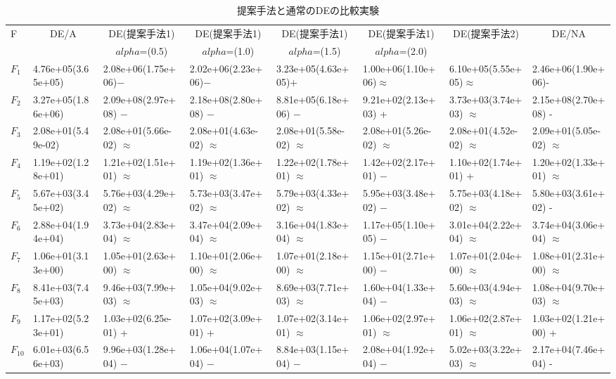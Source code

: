 \documentclass[a4paper,11pt,oneside,openany]{jsbook}
\begin{document}
\begin{landscape}
\begin{table}[!tbp]
\footnotesize
\caption{提案手法と通常のDEの比較実験\label{ref-tb-values}} 
\begin{center}
\begin{tabular}{llllllll}
\hline\hline
\multicolumn{1}{l}{F}&\multicolumn{1}{c}{DE/A}&\multicolumn{1}{c}{DE(提案手法1)}&\multicolumn{1}{c}{DE(提案手法1)}&\multicolumn{1}{c}{DE(提案手法1)}&\multicolumn{1}{c}{DE(提案手法1)}&\multicolumn{1}{c}{DE(提案手法2)}&\multicolumn{1}{c}{DE/NA}\tabularnewline
&&\multicolumn{1}{c}{{\scriptsize $alpha$=(0.5)}}&\multicolumn{1}{c}{{\scriptsize $alpha$=(1.0)}}&\multicolumn{1}{c}{{\scriptsize $alpha$=(1.5)}}&\multicolumn{1}{c}{{\scriptsize $alpha$=(2.0)}}&&\tabularnewline
\hline
$F_{1}$&4.76e+05(3.65e+05)&2.08e+06(1.75e+06)−&2.02e+06(2.23e+06)−&3.23e+05(4.63e+05)+&1.00e+06(1.10e+06)$\approx$&6.10e+05(5.55e+05)$\approx$&2.46e+06(1.90e+06)-\tabularnewline
$F_{2}$&3.27e+05(1.86e+06)&2.09e+08(2.97e+08) −&2.18e+08(2.80e+08) −&8.81e+05(6.18e+06) −&9.21e+02(2.13e+03) +&3.73e+03(3.74e+03) $\approx$&2.15e+08(2.70e+08) -\tabularnewline
$F_{3}$&2.08e+01(5.49e-02)&2.08e+01(5.66e-02) $\approx$&2.08e+01(4.63e-02) $\approx$&2.08e+01(5.58e-02) $\approx$&2.08e+01(5.26e-02) $\approx$&2.08e+01(4.52e-02) $\approx$&2.09e+01(5.05e-02) $\approx$\tabularnewline
$F_{4}$&1.19e+02(1.28e+01)&1.21e+02(1.51e+01) $\approx$&1.19e+02(1.36e+01) $\approx$&1.22e+02(1.78e+01) $\approx$&1.42e+02(2.17e+01) −&1.10e+02(1.74e+01) +&1.20e+02(1.33e+01) $\approx$\tabularnewline
$F_{5}$&5.67e+03(3.45e+02)&5.76e+03(4.29e+02) $\approx$&5.73e+03(3.47e+02) $\approx$&5.79e+03(4.33e+02) $\approx$&5.95e+03(3.48e+02) −&5.75e+03(4.18e+02) $\approx$&5.80e+03(3.61e+02) -\tabularnewline
$F_{6}$&2.88e+04(1.94e+04)&3.73e+04(2.83e+04) $\approx$&3.47e+04(2.09e+04) $\approx$&3.16e+04(1.83e+04) $\approx$&1.17e+05(1.10e+05) −&3.01e+04(2.22e+04) $\approx$&3.74e+04(3.06e+04) $\approx$\tabularnewline
$F_{7}$&1.06e+01(3.13e+00)&1.05e+01(2.63e+00) $\approx$&1.10e+01(2.06e+00) $\approx$&1.07e+01(2.18e+00) $\approx$&1.15e+01(2.71e+00) −&1.07e+01(2.04e+00) $\approx$&1.08e+01(2.31e+00) $\approx$\tabularnewline
$F_{8}$&8.41e+03(7.45e+03)&9.46e+03(7.99e+03) $\approx$&1.05e+04(9.02e+03) $\approx$&8.69e+03(7.71e+03) $\approx$&1.60e+04(1.33e+04) −&5.60e+03(4.94e+03) $\approx$&1.08e+04(9.70e+03) $\approx$\tabularnewline
$F_{9}$&1.17e+02(5.23e+01)&1.03e+02(6.25e-01) +&1.07e+02(3.09e+01) +&1.07e+02(3.14e+01) $\approx$&1.06e+02(2.97e+01) $\approx$&1.06e+02(2.87e+01) $\approx$&1.03e+02(1.21e+00) +\tabularnewline
$F_{10}$&6.01e+03(6.56e+03)&9.96e+03(1.28e+04) −&1.06e+04(1.07e+04) −&8.84e+03(1.15e+04) −&2.08e+04(1.92e+04) −&5.02e+03(3.22e+03) $\approx$&2.17e+04(7.46e+04) -\tabularnewline

\end{tabular}
\end{center}
\end{table}
\end{landscape}
\end{document}
